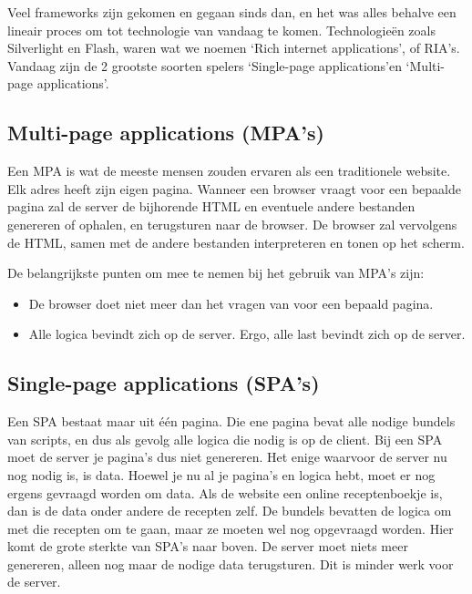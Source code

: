 Veel frameworks zijn gekomen en gegaan sinds dan, en het was alles behalve een lineair proces om tot technologie van vandaag te komen. Technologieën zoals Silverlight en Flash, waren wat we noemen \lq Rich internet applications\rq, of RIA's. Vandaag zijn de 2 grootste soorten spelers \lq Single-page applications\rq en \lq Multi-page applications\rq.


\subsection{Multi-page applications (MPA's)}

Een MPA is wat de meeste mensen zouden ervaren als een traditionele website. Elk adres heeft zijn eigen pagina. Wanneer een browser vraagt voor een bepaalde pagina zal de server de bijhorende HTML en eventuele andere bestanden genereren of ophalen, en terugsturen naar de browser. De browser zal vervolgens de HTML, samen met de andere bestanden interpreteren en tonen op het scherm.

De belangrijkste punten om mee te nemen bij het gebruik van MPA's zijn:

\begin{itemize}
    \item De browser doet niet meer dan het vragen van voor een bepaald pagina.
    \item Alle logica bevindt zich op de server.
    \subitem Ergo, alle last bevindt zich op de server.
\end{itemize}


\subsection{Single-page applications (SPA's)}

Een SPA bestaat maar uit één pagina. Die ene pagina bevat alle nodige bundels van scripts, en dus als gevolg alle logica die nodig is op de client. Bij een SPA moet de server je pagina's dus niet genereren. Het enige waarvoor de server nu nog nodig is, is data. Hoewel je nu al je pagina's en logica hebt, moet er nog ergens gevraagd worden om data. Als de website een online receptenboekje is, dan is de data onder andere de recepten zelf. De bundels bevatten de logica om met die recepten om te gaan, maar ze moeten wel nog opgevraagd worden. Hier komt de grote sterkte van SPA's naar boven. De server moet niets meer genereren, alleen nog maar de nodige data terugsturen. Dit is minder werk voor de server.

